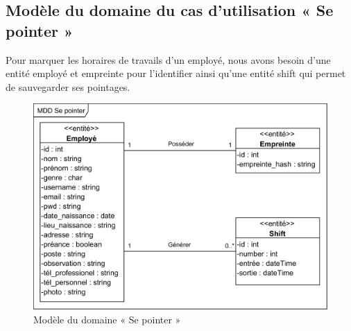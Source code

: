         \subsection*{Modèle du domaine du cas d'utilisation « Se pointer »}
        Pour marquer les horaires de travails d’un employé, nous avons besoin d’une entité employé et empreinte pour l’identifier ainsi qu’une entité shift qui permet de sauvegarder ses pointages. 
            \begin{figure}[h!]
                 \centering
                \includegraphics[scale=1.3]{images/MDD/MDD Se pointer.png}
                 \caption{Modèle du domaine « Se pointer »}
                 \label{fig12}
            \end{figure}


